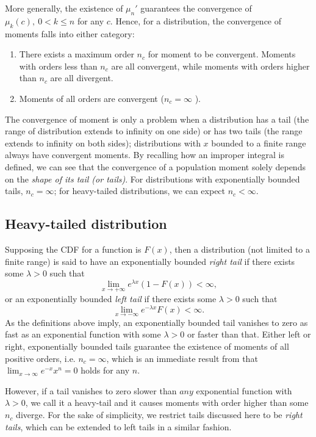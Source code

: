 More generally, the existence of $ \mu_n' $ guarantees the convergence of $ \mu_k(c), \ 0<k \leq n $ for any $ c $. Hence, for a distribution, the convergence of moments falls into either category:
\begin{enumerate}
\item There exists a maximum order $ n_c $ for moment to be convergent. Moments with orders less than $ n_c $ are all convergent, while moments with orders higher than $ n_c $ are all divergent.
\item Moments of all orders are convergent ($ n_c=\infty $ ).
\end{enumerate}

The convergence of moment is only a problem when a distribution has a tail (the range of distribution extends to infinity on one side) or has two tails (the range extends to infinity on both sides); distributions with $ x $ bounded to a finite range always have convergent moments. By recalling how an improper integral is defined, we can see that the convergence of a population moment solely depends on the \textit{shape of its tail (or tails)}. For distributions with exponentially bounded tails, $ n_c = \infty $; for heavy-tailed distributions, we can expect $ n_c < \infty $.  

\subsection{Heavy-tailed distribution}
Supposing the CDF for a function is $ F(x) $, then a distribution (not limited to a finite range) is said to have an exponentially bounded \textit{right tail} if there exists some $ \lambda>0 $ such that 
\begin{equation}
\lim_{x \rightarrow +\infty} e^{\lambda x} (1-F(x)) < \infty,
\end{equation}
or an exponentially bounded \textit{left tail} if there exists some $ \lambda >0 $ such that 
\begin{equation}
\lim_{x \rightarrow -\infty} e^{- \lambda x} F(x) < \infty.
\end{equation}
As the definitions above imply, an exponentially bounded tail vanishes to zero as fast as an exponential function with some $ \lambda>0 $ or faster than that. Either left or right, exponentially bounded tails guarantee the existence of moments of all positive orders, i.e. $ n_c = \infty $, which is an immediate result from that $ \lim_{x \rightarrow \infty} e^{-x} x^n = 0 $ holds for any $ n $. 

However, if a tail vanishes to zero slower than $ any $ exponential function with $ \lambda>0 $, we call it a heavy-tail and it causes moments with order higher than some $ n_c $ diverge. For the sake of simplicity, we restrict tails discussed here to be \textit{right tails}, which can be extended to left tails in a similar fashion. 

